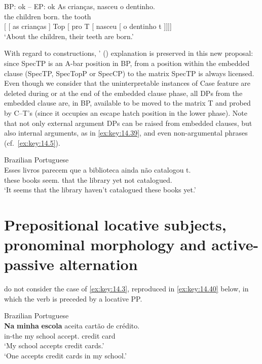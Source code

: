 \documentclass[output=paper]{langsci/langscibook}
\begin{document}
\ea%
    \label{ex:key:14.38} \gls{BP}: ok -- \gls{EP}: ok
    \ea
    \gll    As crianças, nasceu o dentinho.\\
            the children born.\Tsg{} the tooth\\
    \glt
    \ex     {}[ [ as crianças ] Top [ pro\tss{\Expl} T [ nasceu [ o dentinho t ]]]]\\
            ‘About the children, their teeth are born.’
    \z
\z

With regard to  constructions,
\citeauthor{AvelarGalves2011}' (\citeyear{AvelarGalves2011,AvelarGalves2016})
explanation is preserved in this new proposal: since SpecTP is an A-bar
position in BP,  from a position within the embedded clause (SpecTP,
SpecTopP or SpecCP) to the matrix SpecTP is always licensed. Even though we
consider that the uninterpretable instances of Case feature are deleted during
or at the end of the embedded clause phase, all DPs from the embedded clause
are, in BP, available to be moved to the matrix T and probed by C--T’s
 (since it occupies an escape hatch position in the lower
phase).  Note that not only external argument DPs can be raised from embedded
clauses, but also internal arguments, as in \eqref{ex:key:14.39}, and even
non-argumental phrases (cf.\ \eqref{ex:key:14.5}).

\ea\label{ex:key:14.39}Brazilian Portuguese\\
    \gll    Esses  livros parecem que a biblioteca ainda não catalogou t.\\
            these books seem.\Tpl{} that   the library yet not catalogued.\Tsg{}\\
    \glt    ‘It seems that the library haven’t catalogued these books yet.’
\z

\section{Prepositional locative subjects, pronominal morphology and
active-passive alternation}\label{sec:key:14.6}

\textcite{AvelarGalves2011,AvelarGalves2016} do not consider the case of
\eqref{ex:key:14.3}, reproduced in \eqref{ex:key:14.40} below, in which the verb
is preceded by a locative PP.

\ea%
    \label{ex:key:14.40}Brazilian Portuguese\\
    \gll    \textbf{Na} \textbf{minha} \textbf{escola} aceita {cartão de crédito}.\\
            in-the my school accept.\Tsg{} {credit card}\\
    \glt    ‘My school accepts credit cards.’\\
            ‘One accepts credit cards in my school.’
\z
\end{document}
